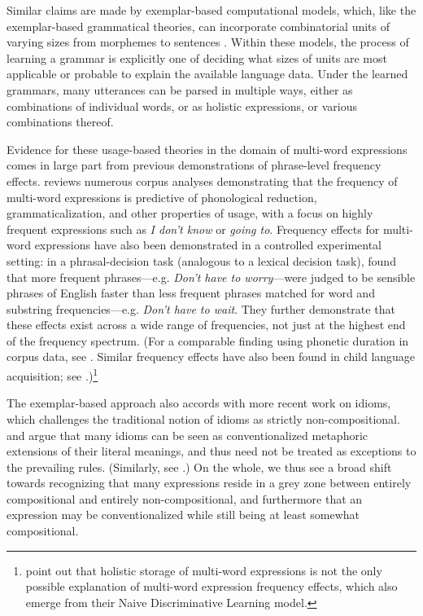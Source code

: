 \documentclass[authoryear]{elsarticle}
\begin{document}
Similar claims are made by exemplar-based computational models, which, like the exemplar-based grammatical theories, can incorporate combinatorial units of varying sizes from morphemes to sentences \citep[e.g.][]{Bod:1998tx,Bod:2003uw, Bod:2008uc, Pierrehumbert:2000wh, Johnson:2007wl, ODonnell:2011vh, Post:2013hh}. Within these models, the process of learning a grammar is explicitly one of deciding what sizes of units are most applicable or probable to explain the available language data. Under the learned grammars, many utterances can be parsed in multiple ways, either as combinations of individual words, or as holistic expressions, or various combinations thereof.

Evidence for these usage-based theories in the domain of multi-word expressions comes in large part from previous demonstrations of phrase-level frequency effects. \citet{Bybee:2006ul} reviews numerous corpus analyses demonstrating that the frequency of multi-word expressions is predictive of phonological reduction, grammaticalization, and other properties of usage, with a focus on highly frequent expressions such as \emph{I don't know} or \emph{going to}. Frequency effects for multi-word expressions have also been demonstrated in a controlled experimental setting: in a phrasal-decision task (analogous to a lexical decision task), \citet{Arnon:2010hz} found that more frequent phrases---e.g. \emph{Don't have to worry}---were judged to be sensible phrases of English faster than less frequent phrases matched for word and substring frequencies---e.g. \emph{Don't have to wait}. They further demonstrate that these effects exist across a wide range of frequencies, not just at the highest end of the frequency spectrum. (For a comparable finding using phonetic duration in corpus data, see \citealp{Arnon:2013tr}. Similar frequency effects have also been found in child language acquisition; see \citealp{Bannard:2008bm}.)\footnote{\citet{Baayen:2013em} point out that holistic storage of multi-word expressions is not the only possible explanation of multi-word expression frequency effects, which also emerge from their Naive Discriminative Learning model.}
	
The exemplar-based approach also accords with more recent work on idioms, which challenges the traditional notion of idioms as strictly non-compositional. \citet{Gibbs:1990wh} and \citet{Nunberg:1994uc} argue that many idioms can be seen as conventionalized metaphoric extensions of their literal meanings, and thus need not be treated as exceptions to the prevailing rules. (Similarly, see \citealp{Holsinger:2013iv}.) On the whole, we thus see a broad shift towards recognizing that many expressions reside in a grey zone between entirely compositional and entirely non-compositional, and furthermore that an expression may be conventionalized while still being at least somewhat compositional.
\end{document}
